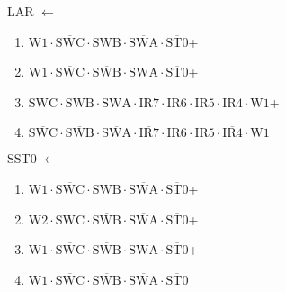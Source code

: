 \documentclass[UTF8]{ctexart}
\begin{document}
LAR $\leftarrow$
\begin{enumerate}[\indent\indent]
	\item $\text{W1} \cdot \overline{\text{SWC}} \cdot \text{SWB} \cdot \overline{\text{SWA}} \cdot \overline{\text{ST0}}$+
	\item $\text{W1} \cdot \overline{\text{SWC}} \cdot \overline{\text{SWB}} \cdot \text{SWA} \cdot \overline{\text{ST0}}$+
	\item $\overline{\text{SWC}} \cdot\overline{\text{SWB}}\cdot \overline{\text{SWA}} \cdot \overline{\text{IR7}} \cdot \text{IR6} \cdot \overline{\text{IR5}} \cdot \text{IR4} \cdot \text{W1}$+
	\item $\overline{\text{SWC}} \cdot\overline{\text{SWB}}\cdot \overline{\text{SWA}} \cdot \overline{\text{IR7}} \cdot \text{IR6} \cdot \text{IR5} \cdot \overline{\text{IR4}} \cdot \text{W1}$
\end{enumerate}

SST0 $\leftarrow$
\begin{enumerate}[\indent\indent]
	\item $\text{W1} \cdot \overline{\text{SWC}} \cdot \text{SWB} \cdot \overline{\text{SWA}} \cdot \overline{\text{ST0}}$+
	\item $\text{W2} \cdot \text{SWC} \cdot \overline{\text{SWB}} \cdot \overline{\text{SWA}} \cdot \overline{\text{ST0}}$+
	\item $\text{W1} \cdot \overline{\text{SWC}} \cdot \overline{\text{SWB}} \cdot \text{SWA} \cdot \overline{\text{ST0}}$+
	\item $\text{W1} \cdot \overline{\text{SWC}} \cdot \overline{\text{SWB}} \cdot \overline{\text{SWA}} \cdot \overline{\text{ST0}}$
\end{enumerate}
\end{document}
